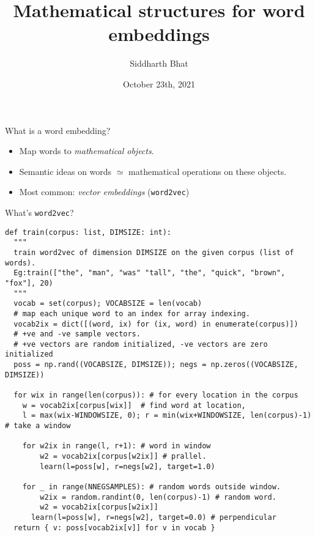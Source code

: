 \documentclass[8pt]{beamer}
\author{Siddharth Bhat}
\date{October 23th, 2021}
\institute{IIIT Hyderabad}
\title{Mathematical structures for word embeddings}
\begin{document}
\maketitle

\begin{frame}[label=sec-1]{What is a word embedding?}
  \pause
\begin{itemize}
  \item Map words to \emph{mathematical objects}.  \pause
  \item Semantic ideas on words $\simeq$ mathematical operations on these objects. \pause
  \item Most common: \emph{vector embeddings} (\texttt{word2vec}) \pause
\end{itemize}
\end{frame}

\begin{frame}[fragile]{What's \texttt{word2vec}?}
\begin{verbatim}
def train(corpus: list, DIMSIZE: int):
  """
  train word2vec of dimension DIMSIZE on the given corpus (list of words).
  Eg:train(["the", "man", "was" "tall", "the", "quick", "brown", "fox"], 20)
  """
  vocab = set(corpus); VOCABSIZE = len(vocab)
  # map each unique word to an index for array indexing.
  vocab2ix = dict([(word, ix) for (ix, word) in enumerate(corpus)])
  # +ve and -ve sample vectors.
  # +ve vectors are random initialized, -ve vectors are zero initialized
  poss = np.rand((VOCABSIZE, DIMSIZE)); negs = np.zeros((VOCABSIZE, DIMSIZE))

  for wix in range(len(corpus)): # for every location in the corpus
    w = vocab2ix[corpus[wix]]  # find word at location,
    l = max(wix-WINDOWSIZE, 0); r = min(wix+WINDOWSIZE, len(corpus)-1) # take a window

    for w2ix in range(l, r+1): # word in window
        w2 = vocab2ix[corpus[w2ix]] # prallel.
        learn(l=poss[w], r=negs[w2], target=1.0)

    for _ in range(NNEGSAMPLES): # random words outside window. 
        w2ix = random.randint(0, len(corpus)-1) # random word.
        w2 = vocab2ix[corpus[w2ix]] 
      learn(l=poss[w], r=negs[w2], target=0.0) # perpendicular
  return { v: poss[vocab2ix[v]] for v in vocab } 
\end{verbatim}
\end{frame}
\end{document}

